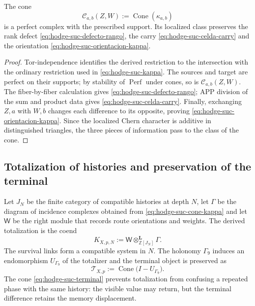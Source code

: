 \begin{proposition}
\label{prop:hodge-suc-celda-perf}
The cone
\begin{equation}\label{eq:hodge-suc-cone-kappa}
 \mathcal C_{a,b}(Z,W):=\operatorname{Cone}(\kappa_{a,b})
\end{equation}
is a perfect complex with the prescribed support. Its localized class
preserves the rank defect \eqref{eq:hodge-suc-defecto-rango}, the carry
\eqref{eq:hodge-suc-celda-carry} and the orientation
\eqref{eq:hodge-suc-orientacion-kappa}.
\end{proposition}

\begin{proof}
Tor-independence identifies the derived restriction to the intersection with the
ordinary restriction used in \eqref{eq:hodge-suc-kappa}. The sources and
target are perfect on their supports; by stability of
\(\operatorname{Perf}\) under cones, so is
\(\mathcal C_{a,b}(Z,W)\). The fiber-by-fiber calculation gives
\eqref{eq:hodge-suc-defecto-rango}; APP division of the sum and
product data gives \eqref{eq:hodge-suc-celda-carry}. Finally, exchanging
\(Z,a\) with \(W,b\) changes each difference to its opposite, proving
\eqref{eq:hodge-suc-orientacion-kappa}. Since the localized Chern character
is additive in distinguished triangles, the three pieces of information pass to the
class of the cone.
\end{proof}

\subsection*{Totalization of histories and preservation of the terminal}

Let \(J_N\) be the finite category of compatible histories at depth
\(N\), let \(\Gamma\) be the diagram of incidence complexes obtained from
\eqref{eq:hodge-suc-cone-kappa} and let \(\mathsf W\) be the right module that
records route orientations and weights. The derived totalization is the
coend
\begin{equation}\label{eq:hodge-suc-coend}
 K_{X,p,N}
 :=\mathsf W\otimes^{\mathbf L}_{\mathbb Z[J_N]}\Gamma.
\end{equation}
The survival links form a compatible system in \(N\). The
holonomy \(\Gamma_9\) induces an endomorphism
\(U_{\Gamma_9}\) of the totalizer and the terminal object is preserved as
\begin{equation}\label{eq:hodge-suc-terminal}
 \mathcal T_{X,p}
 :=\operatorname{Cone}\bigl(I-U_{\Gamma_9}\bigr).
\end{equation}
The cone \eqref{eq:hodge-suc-terminal} prevents totalization from confusing
a repeated phase with the same history: the visible value may return,
but the terminal difference retains the memory displacement.

